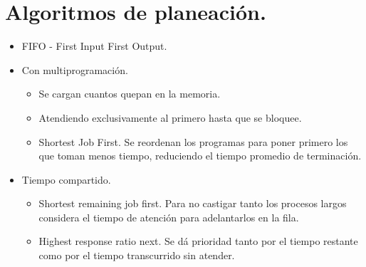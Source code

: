 \section{Algoritmos de planeaci\'{o}n.}
\begin{itemize}
	\item FIFO - First Input First Output.
	\item Con multiprogramaci\'{o}n.
		\begin{itemize}
			\item Se cargan cuantos quepan en la memoria.
			\item Atendiendo exclusivamente al primero hasta que se bloquee.
			\item Shortest Job First.
				Se reordenan los programas para poner primero los que toman menos tiempo, reduciendo el tiempo promedio de terminaci\'{o}n.\\
		\end{itemize}
	\item Tiempo compartido.
		\begin{itemize}
			\item Shortest remaining job first.
				Para no castigar tanto los procesos largos considera el tiempo de atenci\'{o}n para adelantarlos en la fila.
			\item Highest response ratio next.
				Se d\'{a} prioridad tanto por el tiempo restante como por el tiempo transcurrido sin atender.\\
		\end{itemize}
\end{itemize}

